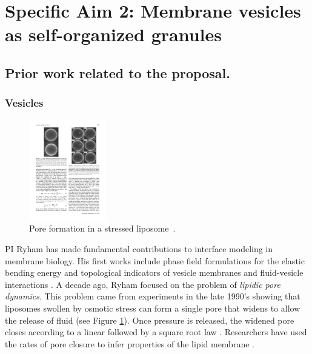 \section{Specific Aim 2: Membrane vesicles as self-organized granules}
\subsection{Prior work related to the proposal.}

\subsubsection{Vesicles}
\begin{figure}
  \vspace{-5pt}
\centerline{\includegraphics[width=0.3\textwidth]{figures/SA1Figures/LiposomePore.pdf}}
  \vspace{-5pt}
\caption{\label{fig:LiposomePore}Pore formation in a
stressed liposome~\cite{Kaetal03, BrdGSa00}.}
\end{figure}
PI Ryham has made fundamental contributions to interface modeling in
membrane biology.  His first works include
phase field formulations for the elastic bending energy \cite{0951-7715-18-3-016,Du05}
and 
topological indicators \cite{DuEuler} of vesicle membranes
and fluid-vesicle interactions \cite{QiangDu09}.
A decade ago, Ryham focused on the
problem of \emph{lipidic pore dynamics}.  
This problem came from 
experiments in the late 1990's 
showing that liposomes swollen by osmotic stress can form a single pore that
widens to allow the release of fluid (see Figure \ref{fig:LiposomePore}). 
Once pressure is released,
the widened pore closes according to a linear
followed by a square root law \cite{BrdGSa00}.  Researchers have
used the rates of pore closure to infer properties of the lipid membrane \cite{PoDi10}. 


